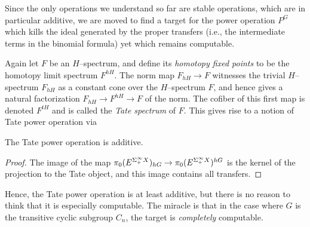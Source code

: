 Since the only operations we understand so far are stable operations, which are in particular additive, we are moved to find a target for the power operation $P^G$ which kills the ideal generated by the proper transfers (i.e., the intermediate terms in the binomial formula) yet which remains computable.

\begin{definition}
Again let $F$ be an $H$--spectrum, and define its \textit{homotopy fixed points} to be the homotopy limit spectrum $F^{hH}$.  The norm map $F_{hH} \to F$ witnesses the trivial $H$--spectrum $F_{hH}$ as a constant cone over the $H$--spectrum $F$, and hence gives a natural factorization $F_{hH} \to F^{hH} \to F$ of the norm.  The cofiber of this first map is denoted $F^{tH}$ and is called the \textit{Tate spectrum} of $F$.  This gives rise to a notion of Tate power operation via
\begin{center}
\end{center}
\end{definition}

\begin{lemma}
The Tate power operation is additive.
\end{lemma}
\begin{proof}
The image of the map $\pi_0 (E^{\Sigma^\infty_+ X})_{hG} \to \pi_0 (E^{\Sigma^\infty_+ X})^{hG}$ is the kernel of the projection to the Tate object, and this image contains all transfers.
\end{proof}

Hence, the Tate power operation is at least additive, but there is no reason to think that it is especially computable.  The miracle is that in the case where $G$ is the transitive cyclic subgroup $C_n$, the target is \emph{completely} computable.

